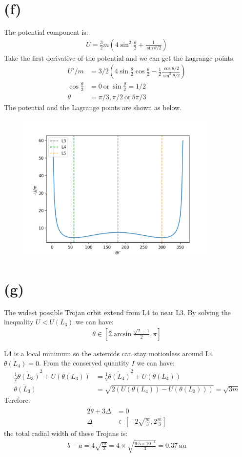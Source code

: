 \documentclass[a4paper,12pt]{article}
\begin{document}
\section*{(f)}
The potential component is:
\begin{align*}
    U = \frac{3}{2}m (4\sin ^2 \frac{\theta}{2} +\frac{1}{\sin \theta/2})
\end{align*}
Take the first derivative of the potential and we can get the Lagrange points:
\begin{align*}
    U'/m &= 3/2(4\sin \frac{\theta}{2} \cos \frac{\theta}{2} - \frac{1}{2} \frac{\cos \theta/2}{\sin^2 \theta/2}) \\
    \cos \frac{\theta}{2} &= 0 \ \text{or} \ \sin \frac{\theta}{2} = 1/2 \\
    \theta &= \pi/3, \pi/2 \ \text{or} \ 5\pi/3
\end{align*}
The potential and the Lagrange points are shown as below.
\begin{figure}[htbp]
    \centering
    \includegraphics*[width=10cm]{Ls.png}
\end{figure}

\section*{(g)}
The widest possible Trojan orbit extend from L4 to near L3. By solving the inequality 
$U<U(L_3)$ we can have:
\begin{align*}
    \theta\in [2\arcsin \frac{\sqrt{2} - 1}{2}, \pi]
\end{align*}

L4 is a local minimum so the asteroids can stay motionless around L4 $\dot{\theta(L_4)} = 0$.
From the conserved quantity $I$ we can have:
\begin{align*}
    \frac{1}{2} \dot{\theta(L_3)}^2 + U(\theta(L_3)) &= \frac{1}{2} \dot{\theta(L_4)}^2 + U(\theta(L_4)) \\
    \dot{\theta(L_3)} &= \sqrt{2 (U(\theta(L_4)) - U(\theta(L_3)))} = \sqrt{3m}
\end{align*}
Terefore:
\begin{align*}
    2\dot{\theta} +3 \Delta &= 0 \\
    \Delta &\in [-2\sqrt{\frac{m}{3}}, 2\frac{m}{3}]
\end{align*}
the total radial width of these Trojans is:
\begin{align*}
    b-a = 4\sqrt{\frac{m}{3}} = 4 \times \sqrt{\frac{9.5 \times 10^{-4}}{3}} = 0.37 \ \text{au}
\end{align*}
\end{document}
